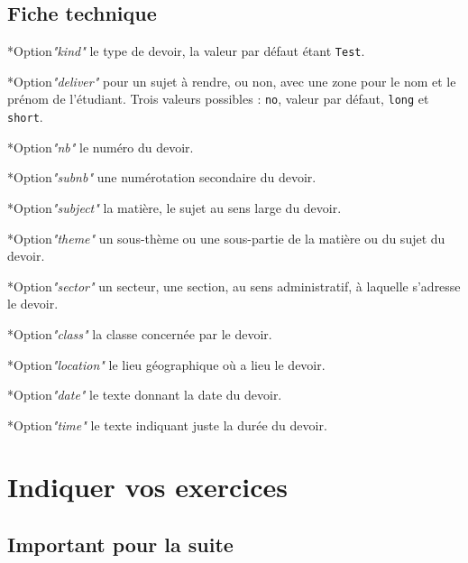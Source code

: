 \documentclass[12pt,a4paper]{scrartcl}
\makeatletter
\theoremstyle{definition}
\newcommand\IDmacro{\@ifstar{\@IDmacroStar}{\@IDmacroNoStar}}
\newcommand\@IDmacroNoStar[3]{%
    \texttt{%
    	\textbackslash#1%
    	\IfStrEq{#2}{0}{}{%
    		\,\,[#2 Option%
			\IfStrEq{#2}{1}{}{s}]%
		}%
	    \IfStrEq{#3}{}{}{%
    		\,\,(#3 Argument%
			\IfStrEq{#3}{1}{}{s})%
		}
   	}
    \immediate\write\tempfile{macro@#1@#2@#3}%
}
\newcommand\@IDmacroStar[2]{%
    \@IDmacroNoStar{#1}{0}{#2}%
}
\newcommand\@IDoptarg{\@ifstar{\@IDoptargStar}{\@IDoptargNoStar}}
\newcommand\@IDoptargStar[2]{%
	\vspace{0.5em}
	--- \texttt{#1%
		\IfStrEq{#2}{}{:}{\,#2:}%
	}%
}
\newcommand\@IDoptargNoStar[2]{%
	\IfStrEq{#2}{}{%
		\@IDoptargStar{#1}{}%
	}{%
		\@IDoptargStar{#1}{\##2}%
	}%
}
\newcommand\IDkey[1]{%
	\@IDoptarg*{Option}{{\itshape "#1"}}%
}
\makeatother
\begin{document}
    \subsection{Fiche technique}

\IDmacro{exam}{11}{}

\IDkey{kind} le type de devoir, la valeur par défaut étant \verb+Test+.

\IDkey{deliver} pour un sujet à rendre, ou non, avec une zone pour le nom et le prénom de l'étudiant. Trois valeurs possibles : \verb+no+, valeur par défaut, \verb+long+ et \verb+short+.

\IDkey{nb} le numéro du devoir.

\IDkey{subnb} une numérotation secondaire du devoir.

\IDkey{subject} la matière, le sujet au sens large du devoir.

\IDkey{theme} un sous-thème ou une sous-partie de la matière ou du sujet du devoir.

\IDkey{sector} un secteur, une section, au sens administratif, à laquelle s'adresse le devoir.

\IDkey{class} la classe concernée par le devoir.

\IDkey{location} le lieu géographique où a lieu le devoir.

\IDkey{date} le texte donnant la date du devoir.

\IDkey{time} le texte indiquant juste la durée du devoir.




\newcommand\exosoptions{
\IDkey{pts} le nombre de points avec le cas particulier de $0$ qui demande d'afficher "Non noté".

\IDkey{time} la durée de l'exercice.

\IDkey{id} un texte de votre choix pour remplacer le numéro (ceci a pour effet de bloquer temporairement la numérotation).

\IDkey{title} un titre.

\IDkey{about} une petite indication liée à l'exercice (comme par exemple qu'il ne s'adresse qu'aux élèves motivés).

\IDkey{src} la source utilisée pour confectionner l'exercice.
}


\section{Indiquer vos exercices}

    \subsection{Important pour la suite}
\end{document}

